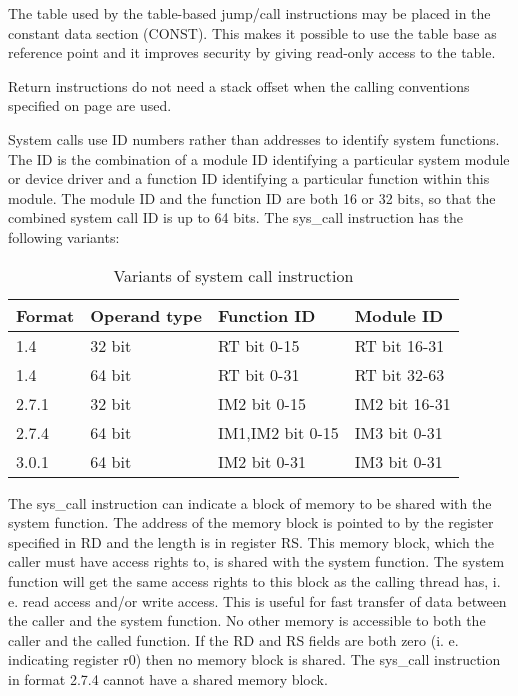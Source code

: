 \documentclass[forwardcom.tex]{subfiles}
\begin{document}
The table used by the table-based jump/call instructions may be placed in the constant data section (CONST). This makes it possible to use the table base as reference point and it improves security by giving read-only access to the table.
\vspace{2mm}

Return instructions do not need a stack offset when the calling conventions specified on page \pageref{functionCallingConventions} are used.
\vspace{2mm}

\label{systemCallInstruction}
System calls use ID numbers rather than addresses to identify system functions. 
The ID is the combination of a module ID identifying a particular system module or device driver and a function ID identifying a particular function within this module. The module ID and the function ID are both 16 or 32 bits, so that the combined system call ID is up to 64 bits.
The sys\_call instruction has the following variants:

\begin{longtable}
{|p{30mm}|p{30mm}|p{30mm}|p{30mm}|}
\caption{Variants of system call instruction}
\label{table:syscallInstructions}
\endfirsthead
\endhead
\hline
Format & Operand type & Function ID & Module ID \\
\hline
1.4 & 32 bit & RT bit 0-15 & RT bit 16-31  \\
\hline
1.4 & 64 bit & RT bit 0-31 & RT bit 32-63  \\
\hline
2.7.1 & 32 bit & IM2 bit 0-15 & IM2 bit 16-31 \\
\hline
2.7.4 & 64 bit & IM1,IM2 bit 0-15 & IM3 bit 0-31 \\
\hline
3.0.1 & 64 bit & IM2 bit 0-31 & IM3 bit 0-31 \\
\hline
\end{longtable}

The sys\_call instruction can indicate a block of memory to be shared with the system function. The address of the memory block is pointed to by the register specified in RD and the length is in register RS. This memory block, which the caller must have access rights to, is shared with the system function. The system function will get the same access rights to this block as the calling thread has, i. e. read access and/or write access. This is useful for fast transfer of data between the caller and the system function. No other memory is accessible to both the caller and the called function. If the RD and RS fields are both zero (i. e. indicating register r0) then no memory block is shared. The sys\_call instruction in format 2.7.4 cannot have a shared memory block.
\vspace{2mm}
\end{document}
